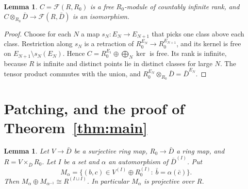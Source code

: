 \documentclass[11pt,a4paper]{article}
\theoremstyle{plain}
\newtheorem{lemma}[theorem]{Lemma}
\theoremstyle{remark}
\newcommand{\Fn}{\mathcal F}
\begin{document}
\begin{lemma}\label{lem:free-functions}
$C=\Fn(R,R_0)$ is a free $R_0$-module of countably infinite rank, and $C\otimes_{R_0}\bar D\to\Fn(R,\bar D)$ is an
isomorphism.
\end{lemma}

\begin{proof}
Choose for each $N$ a map $s_N:E_N\to E_{N+1}$ that picks one class above each class. Restriction along $s_N$ is a
retraction of $R_0^{E_N}\to R_0^{E_{N+1}}$, and its kernel is free on $E_{N+1}\setminus s_N(E_N)$. Hence
$C=R_0^{E_1}\oplus\bigoplus_N\ker$ is free. Its rank is infinite, because $R$ is infinite and distinct points lie in
distinct classes for large $N$. The tensor product commutes with the union, and $R_0^{E_N}\otimes_{R_0}\bar D=\bar
D^{E_N}$.
\end{proof}

\section{Patching, and the proof of Theorem~\ref{thm:main}}

\begin{lemma}\label{lem:patch}
Let $V\to\bar D$ be a surjective ring map, $R_0\to\bar D$ a ring map, and $R=V\times_{\bar D}R_0$. Let $I$ be a set
and $\alpha$ an automorphism of $\bar D^{(I)}$. Put
\[
 M_\alpha=\{(b,c)\in V^{(I)}\oplus R_0^{(I)}:\ \bar b=\alpha(\bar c)\}.
\]
Then $M_\alpha\oplus M_{\alpha^{-1}}\cong R^{(I\sqcup I)}$. In particular $M_\alpha$ is projective over $R$.
\end{lemma}
\end{document}
